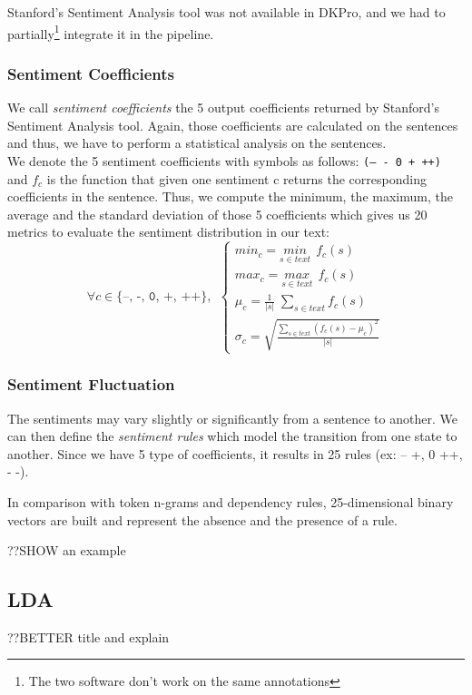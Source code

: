 Stanford's Sentiment Analysis tool was not available in DKPro, and we had to partially\footnote{The two software don't work on the same annotations} integrate it in the pipeline.

\subsubsection{Sentiment Coefficients}
We call \emph{sentiment coefficients} the 5 output coefficients returned by Stanford's Sentiment Analysis tool. Again, those coefficients are calculated on the sentences and thus, we have to perform a statistical analysis on the sentences. 
\\
We denote the 5 sentiment coefficients with symbols as follows: \texttt{(-- - 0 + ++)} and $f_{c}$ is the function that given one sentiment c returns the corresponding coefficients in the sentence. Thus, we compute the minimum, the maximum, the average and the standard deviation of those 5 coefficients which gives us 20 metrics to evaluate the sentiment distribution in our text:
\begin{equation*}
\forall c \in \texttt{\{--, -, 0, +, ++\}}, \: \:
\begin{cases}
min_c = \underset{s \in text}{min} \: \: f_c(s) \\
max_c = \underset{s \in text}{max} \: \: f_c(s) \\
\mu_c = \frac{1}{|s|} \; \displaystyle\sum_{s \in text} f_c(s) \\
\sigma_c = \sqrt{\frac{\displaystyle\sum_{s \in text} (f_c(s) - \mu_c)^2}{|s|}}
\end{cases}
\end{equation*} 

\subsubsection{Sentiment Fluctuation}
The sentiments may vary slightly or significantly from a sentence to another. We can then define the \emph{sentiment rules} which model the transition from one state to another. Since we have 5 type of coefficients, it results in 25 rules (ex: -- \rightarrow +, 0 \rightarrow ++, - \rightarrow -). 

In comparison with token n-grams and dependency rules, 25-dimensional binary vectors are built and represent the absence and the presence of a rule.

??SHOW an example

\subsection{LDA}
??BETTER title and explain








